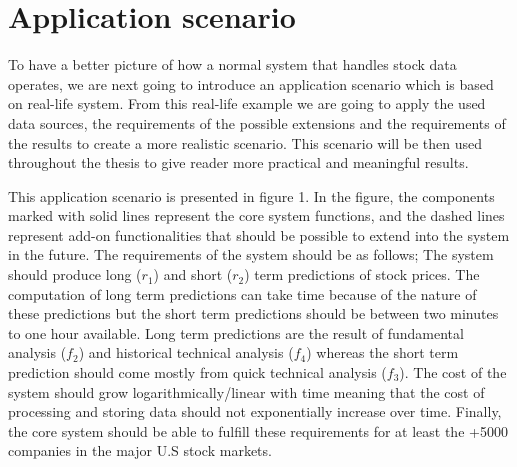 \section{Application scenario}

To have a better picture of how a normal system that handles stock data operates, we are next going to introduce an application scenario which is based on real-life system.
From this real-life example we are going to apply the used data sources, the requirements of the possible extensions and the requirements of the results to create a more realistic scenario.
This scenario will be then used throughout the thesis to give reader more practical and meaningful results.

This application scenario is presented in figure 1.
In the figure, the components marked with solid lines represent the core system functions, and the dashed lines represent add-on functionalities that should be possible to extend into the system in the future.
The requirements of the system should be as follows;
The system should produce long ($r_1$) and short ($r_2$) term predictions of stock prices.
The computation of long term predictions can take time because of the nature of these predictions but the short term predictions should be between two minutes to one hour available.
Long term predictions are the result of fundamental analysis ($f_2$) and historical technical analysis ($f_4$) whereas the short term prediction should come mostly from quick technical analysis ($f_3$).
The cost of the system should grow logarithmically/linear with time meaning that the cost of processing and storing data should not exponentially increase over time.
Finally, the core system should be able to fulfill these requirements for at least the +5000 companies in the major U.S stock markets.

